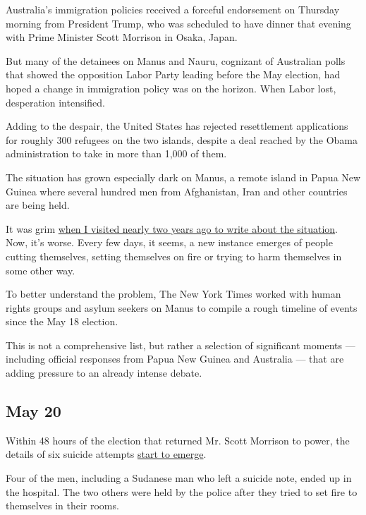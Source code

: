 Australia's immigration policies received a forceful endorsement on
Thursday morning from President Trump, who was scheduled to have dinner
that evening with Prime Minister Scott Morrison in Osaka, Japan.

But many of the detainees on Manus and Nauru, cognizant of Australian
polls that showed the opposition Labor Party leading before the May
election, had hoped a change in immigration policy was on the horizon.
When Labor lost, desperation intensified.

Adding to the despair, the United States has rejected resettlement
applications for roughly 300 refugees on the two islands, despite a deal
reached by the Obama administration to take in more than 1,000 of them.

The situation has grown especially dark on Manus, a remote island in
Papua New Guinea where several hundred men from Afghanistan, Iran and
other countries are being held.

It was grim
\href{https://www.nytimes3xbfgragh.onion/interactive/2017/11/18/world/australia/manus-island-australia-detainees.html?_r=0}{when
I visited nearly two years ago to write about the situation}. Now, it's
worse. Every few days, it seems, a new instance emerges of people
cutting themselves, setting themselves on fire or trying to harm
themselves in some other way.

To better understand the problem, The New York Times worked with human
rights groups and asylum seekers on Manus to compile a rough timeline of
events since the May 18 election.

This is not a comprehensive list, but rather a selection of significant
moments --- including official responses from Papua New Guinea and
Australia --- that are adding pressure to an already intense debate.

\hypertarget{may-20}{%
\subsection{May 20}\label{may-20}}

Within 48 hours of the election that returned Mr. Scott Morrison to
power, the details of six suicide attempts
\href{https://twitter.com/BehrouzBoochani/status/1130424427139674112?s=20}{start
to emerge}.

Four of the men, including a Sudanese man who left a suicide note, ended
up in the hospital. The two others were held by the police after they
tried to set fire to themselves in their rooms.


